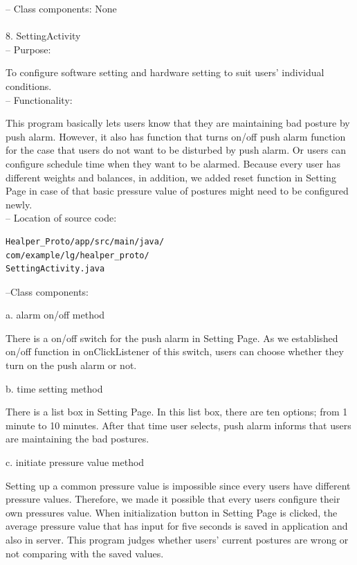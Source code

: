 \documentclass[conference]{IEEEtran}
\begin{document}
 -- Class components: None\\\\
 
8.	SettingActivity\\

 --	Purpose:

To configure software setting and hardware setting to suit users' individual conditions. \\

 --	Functionality:

This program basically lets users know that they are maintaining bad posture by push alarm. However, it also has  function that turns on/off push alarm function for the case that users do not want to be disturbed by push alarm. Or users can configure schedule time when they want to be alarmed. Because every user has different weights and balances, in addition, we added reset function in Setting Page in case of that basic pressure value of postures might need to be configured newly. \\

 -- Location of source code:

\begin{verbatim}
Healper_Proto/app/src/main/java/
com/example/lg/healper_proto/
SettingActivity.java
\end{verbatim}

 --Class components:

a.	alarm on/off method

There is a on/off switch for the push alarm in Setting Page. As we established on/off function in onClickListener of this switch, users can choose whether they turn on the push alarm or not.

b. time setting method

There is a list box in Setting Page. In this list box, there are ten options; from 1 minute to 10 minutes. After that time user selects, push alarm informs that users are maintaining the bad postures.
 
c. initiate pressure value method

Setting up a common pressure value is impossible since every users have different pressure values. Therefore, we made it possible that every users configure their own pressures value. When initialization button in Setting Page is clicked, the average pressure value that has input for five seconds is saved in application and also in server. This program judges whether users' current postures are wrong or not comparing with the saved values. \\\\
\end{document}
